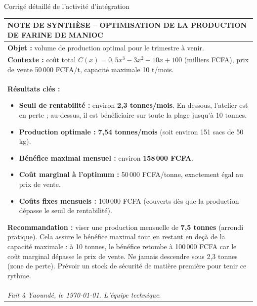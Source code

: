 \documentclass[11pt]{article}
\begin{document}
\begin{exoresolu}{Corrigé détaillé de l'activité d'intégration}
\begin{center}
\begin{tabularx}{\linewidth}{|X|}\hline
\rowcolor{popblueL}
\textbf{NOTE DE SYNTHÈSE -- OPTIMISATION DE LA PRODUCTION DE FARINE DE MANIOC} \\ \hline
\textbf{Objet :} volume de production optimal pour le trimestre à venir. \\[4pt]
\textbf{Contexte :} coût total $C(x)=0,5x^3-3x^2+10x+100$ (milliers FCFA), prix de vente 50\,000 FCFA/t, capacité maximale 10 t/mois. \\[4pt]
\textbf{Résultats clés :}
\begin{itemize}
    \item \textbf{Seuil de rentabilité :} environ \textbf{2,3 tonnes/mois}. En dessous, l'atelier est en perte ; au-dessus, il est bénéficiaire sur toute la plage jusqu'à 10 tonnes.
    \item \textbf{Production optimale :} \textbf{7,54 tonnes/mois} (soit environ 151 sacs de 50 kg).
    \item \textbf{Bénéfice maximal mensuel :} environ \textbf{158\,000 FCFA}.
    \item \textbf{Coût marginal à l'optimum :} 50\,000 FCFA/tonne, exactement égal au prix de vente.
    \item \textbf{Coûts fixes mensuels :} 100\,000 FCFA (couverts dès que la production dépasse le seuil de rentabilité).
\end{itemize}
\textbf{Recommandation :}
viser une production mensuelle de \textbf{7,5 tonnes} (arrondi pratique). Cela assure le bénéfice maximal tout en restant en deçà de la capacité maximale : à 10 tonnes, le bénéfice retombe à 100\,000 FCFA car le coût marginal dépasse le prix de vente. Ne jamais descendre sous 2,3 tonnes (zone de perte). Prévoir un stock de sécurité de matière première pour tenir ce rythme.
\\[4pt]
\textit{Fait à Yaoundé, le \today. L'équipe technique.}
\\ \hline
\end{tabularx}
\end{center}
\end{exoresolu}
\end{document}
